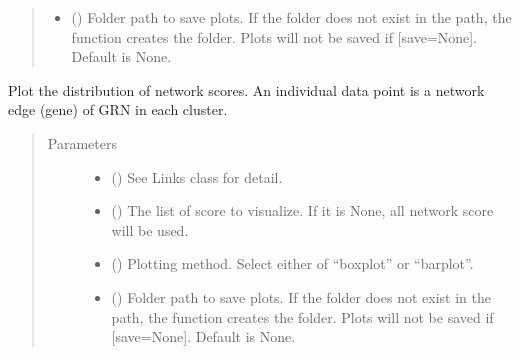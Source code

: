 \documentclass[letterpaper,10pt,english]{sphinxmanual}
\begin{document}
\begin{fulllineitems}
\begin{fulllineitems}
\begin{quote}
\begin{description}
\begin{itemize}
\item {} 
 () \textendash{} Folder path to save plots. If the folder does not exist in the path, the function creates the folder.
Plots will not be saved if {[}save=None{]}. Default is None.

\end{itemize}

\end{description}\end{quote}

\end{fulllineitems}


\begin{fulllineitems}
\label{\detokenize{modules/celloracle:celloracle.Links.plot_score_discributions}}
Plot the distribution of network scores.
An individual data point is a network edge (gene) of GRN in each cluster.
\begin{quote}\begin{description}
\item[{Parameters}] \leavevmode\begin{itemize}
\item {} 
 ({\hyperref[\detokenize{modules/celloracle:celloracle.Links}]{}}) \textendash{} See Links class for detail.

\item {} 
 () \textendash{} The list of score to visualize. If it is None, all network score will be used.

\item {} 
 () \textendash{} Plotting method. Select either of “boxplot” or “barplot”.

\item {} 
 () \textendash{} Folder path to save plots. If the folder does not exist in the path, the function creates the folder.
Plots will not be saved if {[}save=None{]}. Default is None.


\end{itemize}
\end{description}
\end{quote}
\end{fulllineitems}
\end{fulllineitems}
\end{document}
